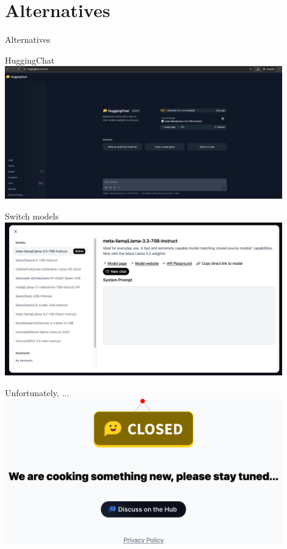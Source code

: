 \documentclass[t,xcolor={dvipsnames},final,aspectratio=169]{beamer}
\begin{document}
\section{Alternatives}

\begin{frame}{}
\huge{Alternatives}
\end{frame}

{
\begin{frame}{HuggingChat}
\includegraphics[width=0.9\textwidth]{img/huggingchat.png}
\end{frame}
}

\begin{frame}{Switch models}
\includegraphics[width=0.9\textwidth]{img/models.png}
\end{frame}

{
\begin{frame}{Unfortunately, ...}
\includegraphics[width=0.9\textwidth]{img/huggingchat_closed.png}
\end{frame}
}
\end{document}
